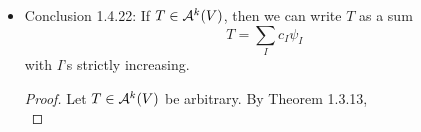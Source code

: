 \documentclass[../notes.tex]{subfiles}
\begin{document}
\begin{itemize}
\begin{enumerate}
\begin{proof}
            Suppose $I=(i_1,\dots,i_k)$ is such that $i_r=i_s$ for some distinct $r,s\in\Sigma_k$. Then $e_I^*=e_{I^{\tau_{i_r,i_s}}}^*$, so
            \begin{equation*}
                \psi_I = \psi_{I^{\tau_{i_r,i_s}}}
                = (-1)^{\tau_{i_r,i_s}}\psi_I
                = -\psi_I
            \end{equation*}
            Therefore, we must have $\psi_I=0$, as desired.
        \end{proof}
        \item If $I$ and $J$ are strictly increasing, then
        \begin{equation*}
            \psi_I(e_{j_1},\dots,e_{j_k}) =
            \begin{cases}
                1 & I=J\\
                0 & I\neq J
            \end{cases}
        \end{equation*}
        \begin{proof}
            We have by definition that
            \begin{equation*}
                \psi_I(e_{j_1},\dots,e_{j_k}) = \sum_\tau(-1)^\tau e_{I^\tau}^*(e_{j_1},\dots,e_{j_k})
            \end{equation*}
            This combined with the facts that
            \begin{equation*}
                e_{I^\tau}^*(e_{j_1},\dots,e_{j_k}) =
                \begin{cases}
                    1 & I^\tau=J\\
                    0 & I^\tau\neq J
                \end{cases}
            \end{equation*}
            $I^\tau$ is strictly increasing iff $I^\tau=I$, and the above equation is nonzero iff $I^\tau=I=J$ implies the desired result.
        \end{proof}
    \end{enumerate}
    \item Conclusion 1.4.22: If $T\in\alt[k]{V}$, then we can write $T$ as a sum
    \begin{equation*}
        T = \sum_Ic_I\psi_I
    \end{equation*}
    with $I$'s strictly increasing.
    \begin{proof}
        Let $T\in\alt[k]{V}$ be arbitrary. By Theorem 1.3.13,
        \begin{equation*}

\end{equation*}
\end{proof}
\end{itemize}
\end{document}
